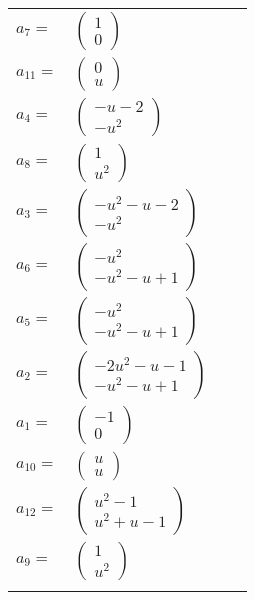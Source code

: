 \documentclass[1p]{elsarticle_modified}
\theoremstyle{definition}
\begin{document}
\begin{tabular}{m{7pt} m{180pt} m{7pt} m{180pt} }
\flushright $a_{7}=$&$\begin{pmatrix}1\\0\end{pmatrix}$ \\
\flushright $a_{11}=$&$\begin{pmatrix}0\\u\end{pmatrix}$ \\
\flushright $a_{4}=$&$\begin{pmatrix}- u-2\\- u^2\end{pmatrix}$ \\
\flushright $a_{8}=$&$\begin{pmatrix}1\\u^2\end{pmatrix}$ \\
\flushright $a_{3}=$&$\begin{pmatrix}- u^2- u-2\\- u^2\end{pmatrix}$ \\
\flushright $a_{6}=$&$\begin{pmatrix}- u^2\\- u^2- u+1\end{pmatrix}$ \\
\flushright $a_{5}=$&$\begin{pmatrix}- u^2\\- u^2- u+1\end{pmatrix}$ \\
\flushright $a_{2}=$&$\begin{pmatrix}-2 u^2- u-1\\- u^2- u+1\end{pmatrix}$ \\
\flushright $a_{1}=$&$\begin{pmatrix}-1\\0\end{pmatrix}$ \\
\flushright $a_{10}=$&$\begin{pmatrix}u\\u\end{pmatrix}$ \\
\flushright $a_{12}=$&$\begin{pmatrix}u^2-1\\u^2+u-1\end{pmatrix}$ \\
\flushright $a_{9}=$&$\begin{pmatrix}1\\u^2\end{pmatrix}$\\&\end{tabular}
\end{document}
